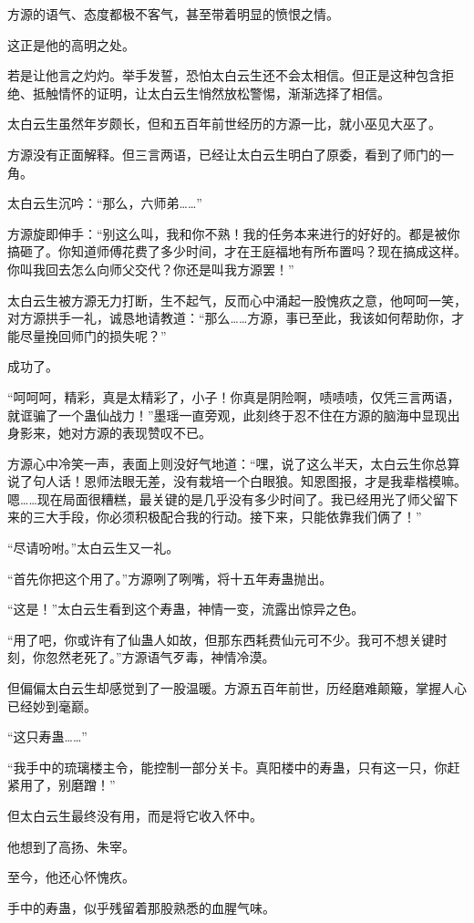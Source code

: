 \begin{this_body}
方源的语气、态度都极不客气，甚至带着明显的愤恨之情。

这正是他的高明之处。

若是让他言之灼灼。举手发誓，恐怕太白云生还不会太相信。但正是这种包含拒绝、抵触情怀的证明，让太白云生悄然放松警惕，渐渐选择了相信。

太白云生虽然年岁颇长，但和五百年前世经历的方源一比，就小巫见大巫了。

方源没有正面解释。但三言两语，已经让太白云生明白了原委，看到了师门的一角。

太白云生沉吟：“那么，六师弟……”

方源旋即伸手：“别这么叫，我和你不熟！我的任务本来进行的好好的。都是被你搞砸了。你知道师傅花费了多少时间，才在王庭福地有所布置吗？现在搞成这样。你叫我回去怎么向师父交代？你还是叫我方源罢！”

太白云生被方源无力打断，生不起气，反而心中涌起一股愧疚之意，他呵呵一笑，对方源拱手一礼，诚恳地请教道：“那么……方源，事已至此，我该如何帮助你，才能尽量挽回师门的损失呢？”

成功了。

“呵呵呵，精彩，真是太精彩了，小子！你真是阴险啊，啧啧啧，仅凭三言两语，就诓骗了一个蛊仙战力！”墨瑶一直旁观，此刻终于忍不住在方源的脑海中显现出身影来，她对方源的表现赞叹不已。

方源心中冷笑一声，表面上则没好气地道：“嘿，说了这么半天，太白云生你总算说了句人话！恩师法眼无差，没有栽培一个白眼狼。知恩图报，才是我辈楷模嘛。嗯……现在局面很糟糕，最关键的是几乎没有多少时间了。我已经用光了师父留下来的三大手段，你必须积极配合我的行动。接下来，只能依靠我们俩了！”

“尽请吩咐。”太白云生又一礼。

“首先你把这个用了。”方源咧了咧嘴，将十五年寿蛊抛出。

“这是！”太白云生看到这个寿蛊，神情一变，流露出惊异之色。

“用了吧，你或许有了仙蛊人如故，但那东西耗费仙元可不少。我可不想关键时刻，你忽然老死了。”方源语气歹毒，神情冷漠。

但偏偏太白云生却感觉到了一股温暖。方源五百年前世，历经磨难颠簸，掌握人心已经妙到毫巅。

“这只寿蛊……”

“我手中的琉璃楼主令，能控制一部分关卡。真阳楼中的寿蛊，只有这一只，你赶紧用了，别磨蹭！”

但太白云生最终没有用，而是将它收入怀中。

他想到了高扬、朱宰。

至今，他还心怀愧疚。

手中的寿蛊，似乎残留着那股熟悉的血腥气味。


\end{this_body}
